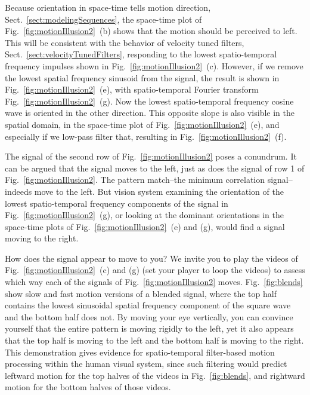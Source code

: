 Because orientation in space-time tells motion direction, Sect.~\ref{sect:modelingSequences}, the space-time plot of Fig.~\ref{fig:motionIllusion2}~(b) shows that the motion should be perceived to left.  This will be consistent with the behavior of velocity tuned filters, Sect.~\ref{sect:velocityTunedFilters}, responding to the lowest spatio-temporal frequency impulses shown in 
Fig.~\ref{fig:motionIllusion2}~(c). However, if we remove the lowest spatial frequency sinusoid from the signal, the result is shown in 
Fig.~\ref{fig:motionIllusion2}~(e), with spatio-temporal Fourier transform Fig.~\ref{fig:motionIllusion2}~(g).  Now the lowest spatio-temporal frequency cosine wave is oriented in the other direction.  This opposite slope is also visible in the spatial domain, in the space-time plot of Fig.~\ref{fig:motionIllusion2}~(e), and especially if we low-pass filter that, resulting in Fig.~\ref{fig:motionIllusion2}~(f).

The signal of the second row of Fig.~\ref{fig:motionIllusion2} poses a conundrum.  It can be argued that the signal moves to the left, just as does the signal of row 1 of Fig.~\ref{fig:motionIllusion2}.  The pattern match--the minimum correlation signal--indeeds move to the left.  But vision system examining the orientation of the lowest spatio-temporal frequency components of the signal in Fig.~\ref{fig:motionIllusion2}~(g), or looking at the dominant orientations in the space-time plots of 
 Fig.~\ref{fig:motionIllusion2}~(e) and (g), would find a signal moving to the right.
 
 How does the signal appear to move to you?  We invite you to play the videos of Fig.~\ref{fig:motionIllusion2}~(c) and (g) (set your player to loop the videos) to assess which way each of the signals of  Fig.~\ref{fig:motionIllusion2} moves.   Fig.~\ref{fig:blends} show slow and fast motion versions of a blended signal, where the top half contains the lowest sinusoidal spatial frequency component of the square wave and the bottom half does not.  By moving your eye vertically, you can convince yourself that the entire pattern is moving rigidly to the left, yet it also appears that the top half is moving to the left and the bottom half is moving to the right.  This demonstration gives evidence for spatio-temporal filter-based motion processing within the human visual system, since such filtering would predict leftward motion for the top halves of the videos in Fig.~\ref{fig:blends}, and rightward motion for the bottom halves of those videos.

